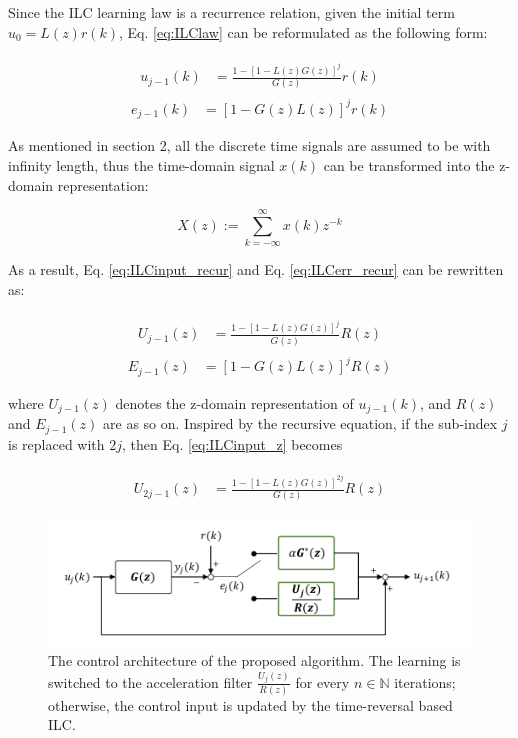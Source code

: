 \documentclass[a4paper, 12pt, twoside, openright]{mythesis}
\begin{document}
 Since the ILC learning law is a recurrence relation, given the initial term $u_{0}=L(z)r(k)$, Eq. \ref{eq:ILClaw} can be reformulated as the following form:

\begin{align}
\begin{split}
u_{j-1}(k) &=\frac{1-[1-L(z)G(z)]^{j}}{G(z)}r(k)
\end{split}
\label{eq:ILCinput_recur}
\end{align}
\begin{align}
e_{j-1}(k) &= [1-G(z)L(z)]^{j}r(k)
\label{eq:ILCerr_recur}
\end{align}

As mentioned in section 2, all the discrete time signals are assumed to be with infinity length, thus the time-domain signal $x(k)$ can be transformed into the z-domain representation:

\begin{equation}
X(z):=\sum_{k=-\infty}^{\infty}x(k)z^{-k}
\label{eq:Ztransform}
\end{equation}

As a result, Eq. \ref{eq:ILCinput_recur} and Eq. \ref{eq:ILCerr_recur} can be rewritten as:

\begin{align}
\begin{split}
U_{j-1}(z) &=\frac{1-[1-L(z)G(z)]^{j}}{G(z)}R(z)
\end{split}
\label{eq:ILCinput_z}
\end{align}
\begin{align}
E_{j-1}(z) &= [1-G(z)L(z)]^{j}R(z)
\label{eq:ILCerr_z}
\end{align}

where $U_{j-1}(z)$ denotes the z-domain representation of $u_{j-1}(k)$, and $R(z)$ and $E_{j-1}(z)$ are as so on. Inspired by the recursive equation, if the sub-index $j$ is replaced with $2j$, then Eq. \ref{eq:ILCinput_z} becomes

\begin{align}
\begin{split}
U_{2j-1}(z) &=\frac{1-[1-L(z)G(z)]^{2j}}{G(z)}R(z)
\end{split}
\label{eq:ILCinput_2j}
\end{align}

\begin{figure}[t]
 	\begin{center}
 	\includegraphics[width=1.1\linewidth]{image/algo1}
 	\caption{The control architecture of the proposed algorithm. The learning is switched to the acceleration filter $\frac{U_j(z)}{R(z)}$ for every $n\in\mathbb{N}$ iterations; otherwise, the control input is updated by the time-reversal based ILC.}
 	\label{fig:algo1}
 	\end{center}
\end{figure} 
\end{document}
